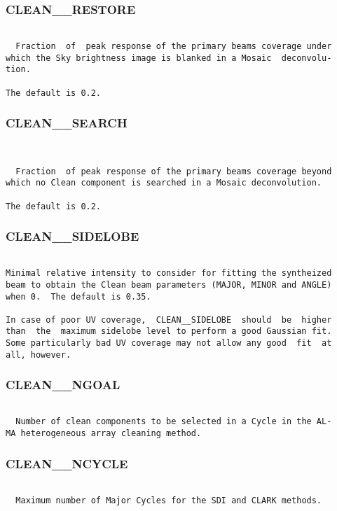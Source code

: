 \subsubsection{CLEAN\_\_RESTORE}
\begin{verbatim}

  Fraction  of  peak response of the primary beams coverage under
which the Sky brightness image is blanked in a Mosaic  deconvolu-
tion.

The default is 0.2.

\end{verbatim}
\subsubsection{CLEAN\_\_SEARCH}
\begin{verbatim}


  Fraction  of peak response of the primary beams coverage beyond
which no Clean component is searched in a Mosaic deconvolution.

The default is 0.2.

\end{verbatim}
\subsubsection{CLEAN\_\_SIDELOBE}
\begin{verbatim}

Minimal relative intensity to consider for fitting the syntheized
beam to obtain the Clean beam parameters (MAJOR, MINOR and ANGLE)
when 0.  The default is 0.35.

In case of poor UV coverage,  CLEAN__SIDELOBE  should  be  higher
than  the  maximum sidelobe level to perform a good Gaussian fit.
Some particularly bad UV coverage may not allow any good  fit  at
all, however.

\end{verbatim}
\subsubsection{CLEAN\_\_NGOAL}
\begin{verbatim}

  Number of clean components to be selected in a Cycle in the AL-
MA heterogeneous array cleaning method.

\end{verbatim}
\subsubsection{CLEAN\_\_NCYCLE}
\begin{verbatim}

  Maximum number of Major Cycles for the SDI and CLARK methods.

\end{verbatim}
